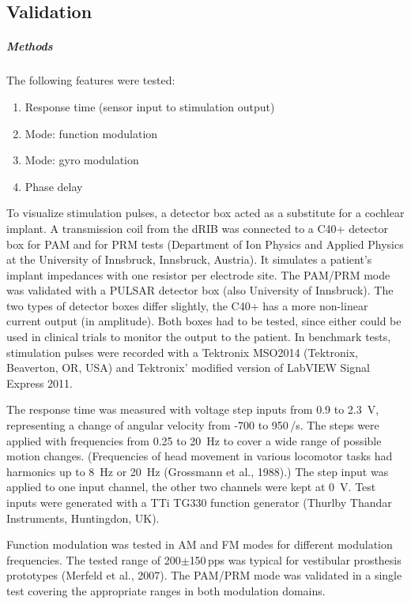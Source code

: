 \subsection{Validation}

\subparagraph{Methods}
The following features were tested:
\begin{enumerate}
\item Response time (sensor input to stimulation output)
\item Mode: function modulation
\item Mode: gyro modulation
\item Phase delay
\end{enumerate}

To visualize stimulation pulses, a detector box acted as a substitute for a cochlear implant. A transmission coil from the dRIB was connected to a C40+ detector box for PAM and for PRM tests (Department of Ion Physics and Applied Physics at the University of Innsbruck, Innsbruck, Austria). It simulates a patient’s implant impedances with one resistor per electrode site. The PAM/PRM mode was validated with a PULSAR detector box (also University of Innsbruck). The two types of detector boxes differ slightly, the C40+ has a more non-linear current output (in amplitude). Both boxes had to be tested, since either could be used in clinical trials to monitor the output to the patient. In benchmark tests, stimulation pulses were recorded with a Tektronix MSO2014 (Tektronix, Beaverton, OR, USA) and Tektronix’ modified version of LabVIEW Signal Express 2011.

The response time was measured with voltage step inputs from 0.9 to \SI{2.3}{\volt}, representing a change of angular velocity from -700 to 950\,\degree /s. The steps were applied with frequencies from 0.25 to \SI{20}{\hertz} to cover a wide range of possible motion changes. (Frequencies of head movement in various locomotor tasks had harmonics up to \SI{8}{\hertz} or \SI{20}{\hertz} (Grossmann et al., 1988).) The step input was applied to one input channel, the other two channels were kept at \SI{0}{\volt}. Test inputs were generated with a TTi TG330 function generator (Thurlby Thandar Instruments, Huntingdon, UK).

Function modulation was tested in AM and FM modes for different modulation frequencies. The tested range of 200$\pm$150\,pps was typical for vestibular prosthesis prototypes (Merfeld et al., 2007). The PAM/PRM mode was validated in a single test covering the appropriate ranges in both modulation domains.
 
